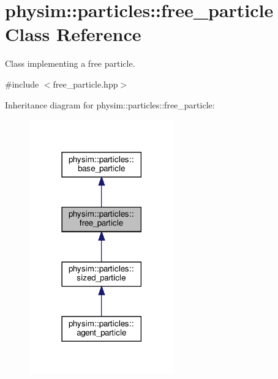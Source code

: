 \hypertarget{classphysim_1_1particles_1_1free__particle}{}\section{physim\+:\+:particles\+:\+:free\+\_\+particle Class Reference}
\label{classphysim_1_1particles_1_1free__particle}


Class implementing a free particle.  




{\ttfamily \#include $<$free\+\_\+particle.\+hpp$>$}



Inheritance diagram for physim\+:\+:particles\+:\+:free\+\_\+particle\+:\nopagebreak
\begin{figure}[H]
\begin{center}
\leavevmode
\includegraphics[width=177pt]{classphysim_1_1particles_1_1free__particle__inherit__graph}
\end{center}
\end{figure}


